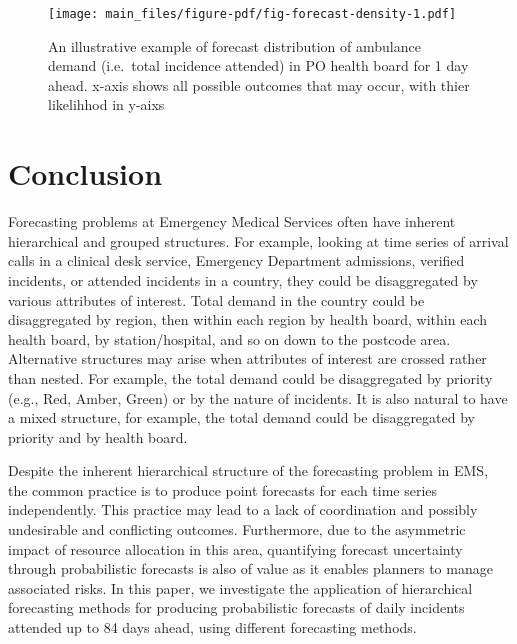 \documentclass[
  authoryear,
  preprint,
  3p]{elsarticle}
\begin{document}
\begin{figure}[H]

{\centering \texttt{[image: main\_files/figure-pdf/fig-forecast-density-1.pdf]}

}

\caption{\label{fig-forecast-density}An illustrative example of forecast
distribution of ambulance demand (i.e.~total incidence attended) in PO
health board for 1 day ahead. x-axis shows all possible outcomes that
may occur, with thier likelihhod in y-aixs}

\end{figure}

\hypertarget{sec-conclusion}{%
\section{Conclusion}\label{sec-conclusion}}

Forecasting problems at Emergency Medical Services often have inherent
hierarchical and grouped structures. For example, looking at time series
of arrival calls in a clinical desk service, Emergency Department
admissions, verified incidents, or attended incidents in a country, they
could be disaggregated by various attributes of interest. Total demand
in the country could be disaggregated by region, then within each region
by health board, within each health board, by station/hospital, and so
on down to the postcode area. Alternative structures may arise when
attributes of interest are crossed rather than nested. For example, the
total demand could be disaggregated by priority (e.g., Red, Amber,
Green) or by the nature of incidents. It is also natural to have a mixed
structure, for example, the total demand could be disaggregated by
priority and by health board.

Despite the inherent hierarchical structure of the forecasting problem
in EMS, the common practice is to produce point forecasts for each time
series independently. This practice may lead to a lack of coordination
and possibly undesirable and conflicting outcomes. Furthermore, due to
the asymmetric impact of resource allocation in this area, quantifying
forecast uncertainty through probabilistic forecasts is also of value as
it enables planners to manage associated risks. In this paper, we
investigate the application of hierarchical forecasting methods for
producing probabilistic forecasts of daily incidents attended up to 84
days ahead, using different forecasting methods.
\end{document}
